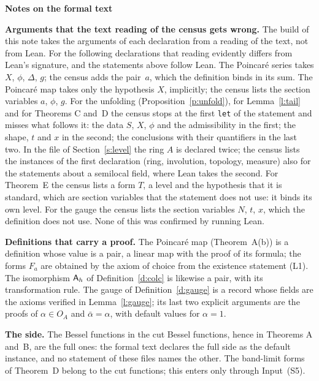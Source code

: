 \documentclass[11pt,a4paper]{article}
\newcommand{\sect}[2]{\refstepcounter{section}\label{#2}\par\addvspace{19pt plus 4pt minus 2pt}\Needspace{7\baselineskip}%
  \noindent\llap{{\fontsize{13.2}{16}\selectfont\bfseries\color{inkfaint}\thesection}\hspace{9pt}}%
  {\fontsize{13.2}{16}\selectfont\bfseries\color{ink}#1}\par\nopagebreak\vspace{-1pt}}
\newcommand{\subhead}[1]{\par\addvspace{9pt plus 2pt}\Needspace{4\baselineskip}\noindent\textbf{#1}\enspace\ignorespaces}
\theoremstyle{plainx}
\theoremstyle{uprightx}
\newcommand{\Inp}[1]{\textup{(#1)}}
\begin{document}
\sect{Notes on the formal text}{s:notes}
\subhead{Arguments that the text reading of the census gets wrong.} The build of this note takes the arguments of
each declaration from a reading of the text, not from Lean. For the following declarations that reading evidently
differs from Lean's signature, and the statements above follow Lean. The Poincar\'e series takes $X$, $\phi$,
$\Delta$, $g$; the census adds the pair~$a$, which the definition binds in its sum. The Poincar\'e map takes only
the hypothesis $X$, implicitly; the census lists the section variables $a$, $\phi$, $g$. For the unfolding
(Proposition~\ref{p:unfold}), for Lemma~\ref{l:tail} and for Theorems C and~D the census stops at the first
\texttt{let} of the statement and misses what follows it: the data $S$, $X$, $\phi$ and the admissibility in the
first; the shape, $t$ and $x$ in the second; the conclusions with their quantifiers in the last two. In the file of
Section~\ref{s:level} the ring $A$ is declared twice; the census lists the instances of the first declaration
(ring, involution, topology, measure) also for the statements about a semilocal field, where Lean takes the
second. For Theorem~E the census lists a form $T$, a level and the hypothesis that it is standard, which are
section variables that the statement does not use: it binds its own level. For the gauge the census lists the
section variables $N$, $t$, $x$, which the definition does not use. None of this was confirmed by running Lean.

\subhead{Definitions that carry a proof.} The Poincar\'e map (Theorem~A(b)) is a definition whose value is a pair,
a linear map with the proof of its formula; the forms $F_a$ are obtained by the axiom of choice from the
existence statement \Inp{L1}. The isomorphism $\mathsf{A}_{h}$ of Definition~\ref{d:colc} is likewise a pair, with its
transformation rule. The gauge of Definition~\ref{d:gauge} is a record whose fields are the axioms verified in
Lemma~\ref{l:gauge}; its last two explicit arguments are the proofs of $\alpha\in O_A$ and $\bar\alpha=\alpha$, with
default values for $\alpha=1$.

\subhead{The side.} The Bessel functions in the cut Bessel functions, hence in Theorems A and~B, are the full ones:
the formal text declares the full side as the default instance, and no statement of these files names the other.
The band-limit forms of Theorem~D belong to the cut functions; this enters only through Input~\Inp{S5}.
\end{document}
